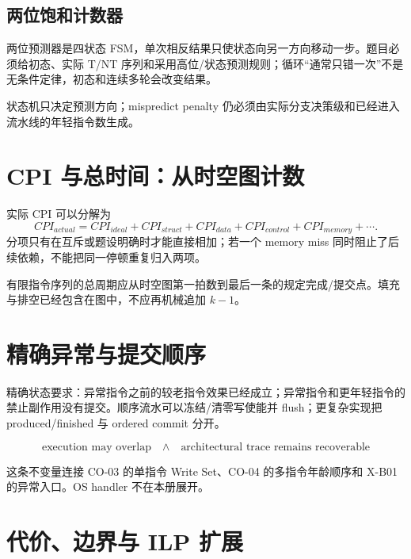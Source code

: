 \documentclass[UTF8,fontset=fandol,11pt,a4paper]{ctexart}
\begin{document}
\subsection{两位饱和计数器}
两位预测器是四状态 FSM，单次相反结果只使状态向另一方向移动一步。题目必须给初态、实际 T/NT 序列和采用高位/状态预测规则；循环“通常只错一次”不是无条件定律，初态和连续多轮会改变结果。

\begin{center}
\resizebox{0.96\linewidth}{!}{}
\end{center}
状态机只决定预测方向；mispredict penalty 仍必须由实际分支决策级和已经进入流水线的年轻指令数生成。

\section{CPI 与总时间：从时空图计数}

实际 CPI 可以分解为
\[
CPI_{actual}=CPI_{ideal}
+CPI_{struct}+CPI_{data}+CPI_{control}+CPI_{memory}+\cdots.
\]
分项只有在互斥或题设明确时才能直接相加；若一个 memory miss 同时阻止了后续依赖，不能把同一停顿重复归入两项。

有限指令序列的总周期应从时空图第一拍数到最后一条的规定完成/提交点。填充与排空已经包含在图中，不应再机械追加 $k-1$。

\section{精确异常与提交顺序}

精确状态要求：异常指令之前的较老指令效果已经成立；异常指令和更年轻指令的禁止副作用没有提交。顺序流水可以冻结/清零写使能并 flush；更复杂实现把 produced/finished 与 ordered commit 分开。

\[
\boxed{\text{execution may overlap}\quad\land\quad
\text{architectural trace remains recoverable}}
\]

这条不变量连接 CO-03 的单指令 Write Set、CO-04 的多指令年龄顺序和 X-B01 的异常入口。OS handler 不在本册展开。

\section{代价、边界与 ILP 扩展}
\end{document}
